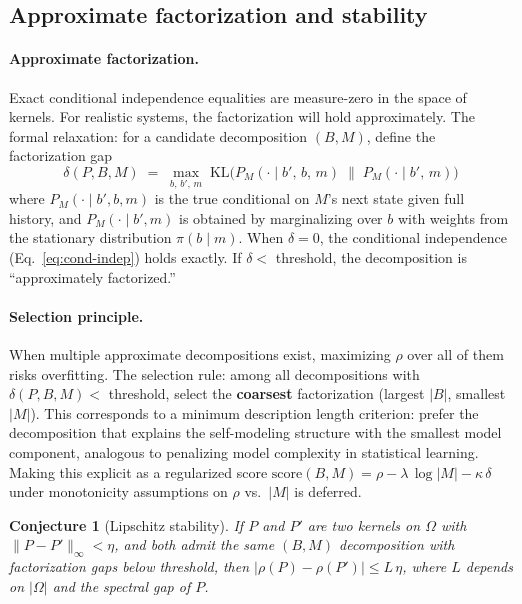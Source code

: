 \documentclass[12pt]{article}
\newtheorem{conjecture}[theorem]{Conjecture}
\theoremstyle{remark}
\newcommand{\KL}{\mathrm{KL}}
\begin{document}
\subsection{Approximate factorization and stability}\label{app:approx}

\paragraph{Approximate factorization.} Exact conditional independence equalities are measure-zero in the space of kernels. For realistic systems, the factorization will hold approximately. The formal relaxation: for a candidate decomposition $(B, M)$, define the factorization gap
\begin{equation}\label{eq:delta-app}
  \delta(P, B, M) \;=\; \max_{b,\,b',\,m}\; \KL\!\bigl(P_M(\cdot \mid b',\, b,\, m) \;\|\; P_M(\cdot \mid b',\, m)\bigr)
\end{equation}
where $P_M(\cdot \mid b', b, m)$ is the true conditional on $M$'s next state given full history, and $P_M(\cdot \mid b', m)$ is obtained by marginalizing over $b$ with weights from the stationary distribution $\pi(b \mid m)$. When $\delta = 0$, the conditional independence (Eq.~\ref{eq:cond-indep}) holds exactly. If $\delta < $ threshold, the decomposition is ``approximately factorized.''

\paragraph{Selection principle.} When multiple approximate decompositions exist, maximizing $\rho$ over all of them risks overfitting. The selection rule: among all decompositions with $\delta(P, B, M) < $ threshold, select the \textbf{coarsest} factorization (largest $|B|$, smallest $|M|$). This corresponds to a minimum description length criterion: prefer the decomposition that explains the self-modeling structure with the smallest model component, analogous to penalizing model complexity in statistical learning. Making this explicit as a regularized score $\text{score}(B,M) = \rho - \lambda\,\log|M| - \kappa\,\delta$ under monotonicity assumptions on $\rho$ vs.\ $|M|$ is deferred.

\begin{conjecture}[Lipschitz stability]\label{conj:lip-app}
If $P$ and $P'$ are two kernels on $\Omega$ with $\|P - P'\|_\infty < \eta$, and both admit the same $(B, M)$ decomposition with factorization gaps below threshold, then $|\rho(P) - \rho(P')| \leq L\,\eta$, where $L$ depends on $|\Omega|$ and the spectral gap of $P$.
\end{conjecture}
\end{document}
